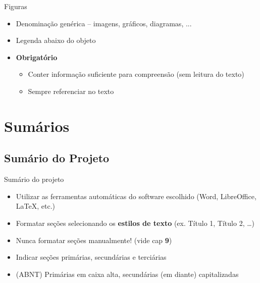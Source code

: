 \documentclass{beamer}
\begin{document}
\begin{frame}{Figuras}
  \begin{itemize}
    \footnotesize
  \item Denominação genérica -- {\scriptsize imagens, gráficos, diagramas,} ...
  \item Legenda abaixo do objeto
    \bigskip
  \item \alert{\bf Obrigatório}
    \begin{itemize}
      \scriptsize
    \item Conter informação suficiente para compreensão ({\tiny sem leitura do texto})
    \item Sempre referenciar no texto
    \end{itemize}
  \end{itemize}
\end{frame}

\section{Sumários}

\subsection{Sumário do Projeto}

\begin{frame}{Sumário do projeto}
  \begin{itemize}
  \item Utilizar as ferramentas automáticas do software escolhido
    (Word, LibreOffice, \LaTeX, etc.)
  \item Formatar seções selecionando os {\bf estilos de texto}
    (ex. Título 1, Título 2, \ldots)
  \item \alert{Nunca} formatar seções manualmente! (vide cap {\bf 9})
  \item Indicar seções primárias, secundárias e terciárias
  \item (ABNT) Primárias em caixa alta, secundárias (em diante)
    capitalizadas
  \end{itemize}
\end{frame}
\end{document}
